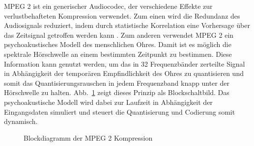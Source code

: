 \ac{MPEG 2} ist ein generischer Audiocodec, der verschiedene Effekte zur verlustbehafteten Kompression verwendet. Zum einen wird die Redundanz des Audiosignals reduziert, indem durch statistische Korrelation eine Vorhersage über das Zeitsignal getroffen werden kann \cite{dab_buch}. Zum anderen verwendet \ac{MPEG 2} ein psychoakustisches Modell des menschlichen Ohres. Damit ist es möglich die spektrale Hörschwelle an einem bestimmten Zeitpunkt zu bestimmen. Diese Information kann genutzt werden, um das in 32 Frequenzbänder zerteilte Signal in Abhängigkeit der temporären Empfindlichkeit des Ohres zu quantisieren und somit das Quantisierungsrauschen in jedem Frequenzband knapp unter der Hörschwelle zu halten. Abb.~\ref{chart:MPEG} zeigt dieses Prinzip als Blockschaltbild. Das psychoakustische Modell wird dabei zur Laufzeit in Abhängigkeit der Eingangsdaten simuliert und steuert die Quantisierung und Codierung somit dynamisch.
\\
\begin{figure} [h]
\begin{center}
\caption{Blockdiagramm der MPEG 2 Kompression}
\label{chart:MPEG}
\end{center}
\end{figure}


